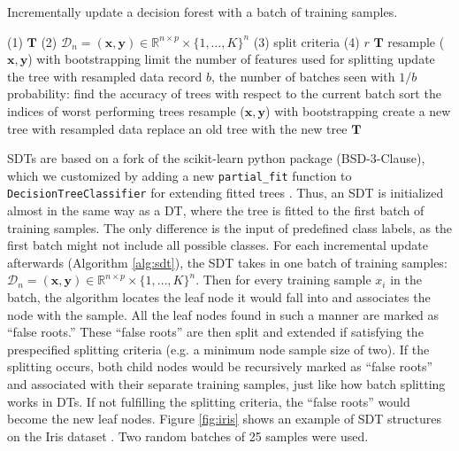 \begin{algorithm}[!htb]
\caption{Incrementally update a decision forest with a batch of training samples.}
\label{alg:sdf}
\begin{algorithmic}[1]
\Require
\Statex (1) $\mathbf{T}$ 
\Statex (2) $\mathcal{D}_n = (\mathbf{x},\mathbf{y}) \in \mathbb{R}^{n \times p} \times \{1,\ldots, K\}^n$ 
\Statex (3) split criteria 
\Statex (4) $r$ 
\Ensure
$\mathbf{T}$ 
\State resample ($\mathbf{x},\mathbf{y}$) with bootstrapping
\State limit the number of features used for splitting
\State update the tree with resampled data 
\EndFor
\State record $b$, the number of batches seen
with $1/b$ probability:
\State find the accuracy of trees with respect to the current batch
\State sort the indices of worst performing trees
\State resample ($\mathbf{x},\mathbf{y}$) with bootstrapping
\State create a new tree with resampled data
\State replace an old tree with the new tree 
\EndFor
\EndIf
\State \Return $\mathbf{T}$
\EndFunction
\end{algorithmic}
\end{algorithm}

SDTs are based on a fork of the scikit-learn python package (BSD-3-Clause), which we customized by adding a new \texttt{partial\_fit} function to \texttt{DecisionTreeClassifier} for extending fitted trees \citep{pedregosa_scikit-learn_2011}. Thus, an SDT is initialized almost in the same way as a DT, where the tree is fitted to the first batch of training samples. The only difference is the input of predefined class labels, as the first batch might not include all possible classes. 
For each incremental update afterwards (Algorithm \ref{alg:sdt}), the SDT takes in one batch of training samples: $\mathcal{D}_n = (\mathbf{x},\mathbf{y}) \in \mathbb{R}^{n \times p} \times \{1,\ldots, K\}^n$. 
Then for every training sample $x_i$ in the batch, the algorithm locates the leaf node it would fall into and associates the node with the sample. All the leaf nodes found in such a manner are marked as ``false roots.'' 
These ``false roots'' are then split and extended if satisfying the prespecified splitting criteria (e.g. a minimum node sample size of two). 
If the splitting occurs, both child nodes would be recursively marked as ``false roots'' and associated with their separate training samples, just like how batch splitting works in DTs. If not fulfilling the splitting criteria, the ``false roots'' would become the new leaf nodes. Figure \ref{fig:iris} shows an example of SDT structures on the Iris dataset \citep{fisher_uci_1988}. Two random batches of 25 samples were used.

